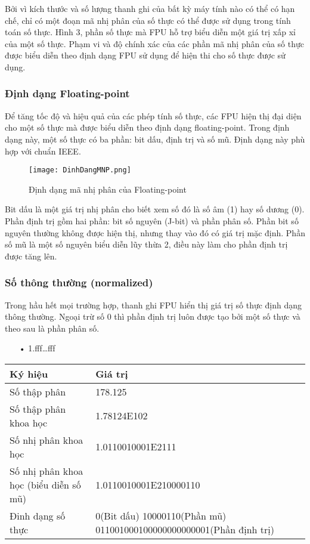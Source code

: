 		Bởi vì kích thước và số lượng thanh ghi của bất kỳ máy tính nào có thể có hạn chế, chỉ có một đoạn mã nhị phân của số thực có thể được sử dụng trong tính toán số thực. Hình 3, phần số thực mà FPU hỗ trợ biểu diễn một giá trị xấp xỉ của một số thực. Phạm vi và độ chính xác của các phần mã nhị phân của số thực được biểu diễn theo định dạng FPU sử dụng để hiện thi cho số thực được sử dụng.
		
		\subsubsection*{Định dạng Floating-point}
		Để tăng tốc độ và hiệu quả của các phép tính số thực, các FPU hiện thị đại diện cho một số thực mà được biểu diễn theo định dạng floating-point. Trong định dạng này, một số thực có ba phần: bit dấu, định trị và số mũ. Định dạng này phù hợp với chuẩn IEEE.\\
		\begin{center}
			\begin{figure}[htp]
				\begin{center}
					\texttt{[image: DinhDangMNP.png]}
				\end{center}
				\caption{Định dạng mã nhị phân của Floating-point}				
			\end{figure}
		\end{center}		
		
		Bit dấu là một giá trị nhị phân cho biết xem số đó là số âm (1) hay số dương (0). Phần định trị gồm hai phần: bit số nguyên (J-bit) và phần phân số. Phần bit số nguyên thường không được hiện thị, nhưng thay vào đó có giá trị mặc định. Phần số mũ là một số nguyên biểu diễn lũy thừa 2, điều này làm cho phần định trị được tăng lên.
		
		\subsubsection*{Số thông thường (normalized)}	
		Trong hầu hết mọi trường hợp, thanh ghi FPU hiển thị giá trị số thực định dạng thông thường. Ngoại trừ số 0 thì phần định trị luôn được tạo bởi một số thực và theo sau là phần phân số.
		\begin{itemize}
			\item[•	]1.fff…fff
		\end{itemize}
				
	\begin{longtable}{ | m{7cm} | m{7cm} | }
		\hline
				Ký hiệu & Giá trị\\
		\hline
		\hline
			Số thập phân	&178.125\\
		\hline	
			Số thập phân khoa học&	1.78124E102\\
		\hline	
			Số nhị phân khoa học	&1.0110010001E2111\\
		\hline	
			Số nhị phân khoa học (biểu diễn số mũ)	&1.0110010001E210000110\\
		\hline
			Đinh dạng số thực & 0(Bit dấu)  10000110(Phần mũ)	 011001000100000000000001(Phần định trị)\\
		\hline
	\end{longtable}		
		
